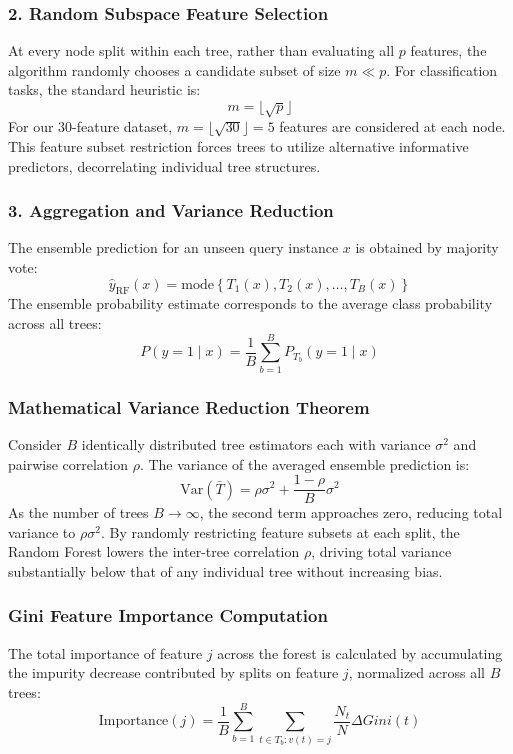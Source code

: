 \documentclass[12pt,a4paper]{article}
\begin{document}
\subsubsection*{2. Random Subspace Feature Selection}
At every node split within each tree, rather than evaluating all $p$ features, the algorithm randomly chooses a candidate subset of size $m \ll p$. For classification tasks, the standard heuristic is:
\begin{equation}
m = \lfloor \sqrt{p} \rfloor
\end{equation}
For our 30-feature dataset, $m = \lfloor \sqrt{30} \rfloor = 5$ features are considered at each node. This feature subset restriction forces trees to utilize alternative informative predictors, decorrelating individual tree structures.

\subsubsection*{3. Aggregation and Variance Reduction}
The ensemble prediction for an unseen query instance $x$ is obtained by majority vote:
\begin{equation}
\hat{y}_{\text{RF}}(x) = \text{mode} \left\{ T_1(x), T_2(x), \dots, T_B(x) \right\}
\end{equation}
The ensemble probability estimate corresponds to the average class probability across all trees:
\begin{equation}
P(y = 1 \mid x) = \frac{1}{B} \sum_{b=1}^{B} P_{T_b}(y = 1 \mid x)
\end{equation}

\subsubsection*{Mathematical Variance Reduction Theorem}
Consider $B$ identically distributed tree estimators each with variance $\sigma^2$ and pairwise correlation $\rho$. The variance of the averaged ensemble prediction is:
\begin{equation}
\text{Var}(\bar{T}) = \rho \sigma^2 + \frac{1 - \rho}{B} \sigma^2
\end{equation}
As the number of trees $B \to \infty$, the second term approaches zero, reducing total variance to $\rho \sigma^2$. By randomly restricting feature subsets at each split, the Random Forest lowers the inter-tree correlation $\rho$, driving total variance substantially below that of any individual tree without increasing bias.

\subsubsection*{Gini Feature Importance Computation}
The total importance of feature $j$ across the forest is calculated by accumulating the impurity decrease contributed by splits on feature $j$, normalized across all $B$ trees:
\begin{equation}
\text{Importance}(j) = \frac{1}{B} \sum_{b=1}^{B} \sum_{t \in T_b: v(t)=j} \frac{N_t}{N} \Delta Gini(t)
\end{equation}
\end{document}

